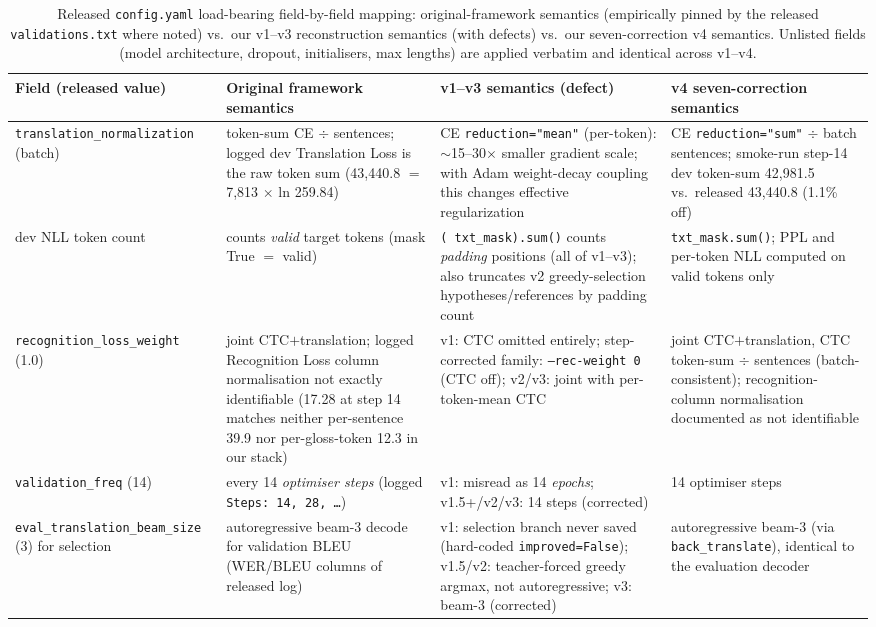 \documentclass[pdflatex,sn-chicago]{sn-jnl}
\begin{document}
\begin{table}[h]
\centering
\scriptsize\setlength{\tabcolsep}{3pt}
\caption{Released \texttt{config.yaml} load-bearing field-by-field mapping: original-framework semantics (empirically pinned by the released \texttt{validations.txt} where noted) vs.\ our v1--v3 reconstruction semantics (with defects) vs.\ our seven-correction v4 semantics. Unlisted fields (model architecture, dropout, initialisers, max lengths) are applied verbatim and identical across v1--v4.}
\label{tab:config_mapping}
\begin{tabular}{p{2.9cm}p{3.5cm}p{3.4cm}p{3.4cm}}
\toprule
Field (released value) & Original framework semantics & v1--v3 semantics (defect) & v4 seven-correction semantics \\
\midrule
\texttt{translation\_normalization} (batch) & token-sum CE $\div$ sentences; logged dev Translation Loss is the raw token sum (43{,}440.8 $=$ 7{,}813 $\times$ ln 259.84) & CE \texttt{reduction="mean"} (per-token): $\sim$15--30$\times$ smaller gradient scale; with Adam weight-decay coupling this changes effective regularization & CE \texttt{reduction="sum"} $\div$ batch sentences; smoke-run step-14 dev token-sum 42{,}981.5 vs.\ released 43{,}440.8 (1.1\% off) \\
\midrule
dev NLL token count & counts \emph{valid} target tokens (mask True $=$ valid) & \texttt{(~txt\_mask).sum()} counts \emph{padding} positions (all of v1--v3); also truncates v2 greedy-selection hypotheses/references by padding count & \texttt{txt\_mask.sum()}; PPL and per-token NLL computed on valid tokens only \\
\midrule
\texttt{recognition\_loss\_weight} (1.0) & joint CTC$+$translation; logged Recognition Loss column normalisation not exactly identifiable (17.28 at step 14 matches neither per-sentence 39.9 nor per-gloss-token 12.3 in our stack) & v1: CTC omitted entirely; step-corrected family: \texttt{--rec-weight 0} (CTC off); v2/v3: joint with per-token-mean CTC & joint CTC$+$translation, CTC token-sum $\div$ sentences (batch-consistent); recognition-column normalisation documented as not identifiable \\
\midrule
\texttt{validation\_freq} (14) & every 14 \emph{optimiser steps} (logged \texttt{Steps: 14, 28, \ldots}) & v1: misread as 14 \emph{epochs}; v1.5+/v2/v3: 14 steps (corrected) & 14 optimiser steps \\
\midrule
\texttt{eval\_translation\_beam\_size} (3) for selection & autoregressive beam-3 decode for validation BLEU (WER/BLEU columns of released log) & v1: selection branch never saved (hard-coded \texttt{improved=False}); v1.5/v2: teacher-forced greedy argmax, not autoregressive; v3: beam-3 (corrected) & autoregressive beam-3 (via \texttt{back\_translate}), identical to the evaluation decoder \\

\end{tabular}
\end{table}
\end{document}
